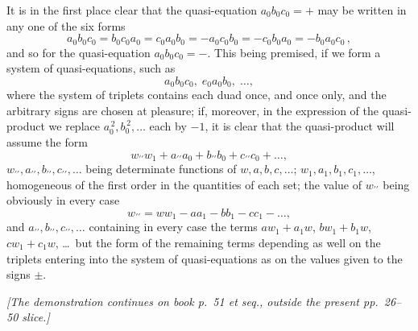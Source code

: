 \documentclass[11pt,a4paper]{article}
\theoremstyle{plain}
\begin{document}
It is in the first place clear that the quasi-equation $a_0 b_0 c_0 = +$ may be written in any one of the six forms
\[a_0 b_0 c_0 = b_0 c_0 a_0 = c_0 a_0 b_0 = -a_0 c_0 b_0 = -c_0 b_0 a_0 = -b_0 a_0 c_0\,,\]
and so for the quasi-equation $a_0 b_0 c_0 = -$. This being premised, if we form a system of quasi-equations, such as
\[a_0 b_0 c_0,\; e_0 a_0 b_0,\; \ldots,\]
where the system of triplets contains each duad once, and once only, and the arbitrary signs are chosen at pleasure; if, moreover, in the expression of the quasi-product we replace $a_0^{\,2}, b_0^{\,2}, \ldots$ each by $-1$, it is clear that the quasi-product will assume the form
\[w_{\prime\prime} w_1 + a_{\prime\prime} a_0 + b_{\prime\prime} b_0 + c_{\prime\prime} c_0 + \ldots,\]
$w_{\prime\prime}, a_{\prime\prime}, b_{\prime\prime}, c_{\prime\prime}, \ldots$ being determinate functions of $w, a, b, c, \ldots$; $w_1, a_1, b_1, c_1, \ldots$, homogeneous of the first order in the quantities of each set; the value of $w_{\prime\prime}$ being obviously in every case
\[w_{\prime\prime} = w w_1 - a a_1 - b b_1 - c c_1 - \ldots,\]
and $a_{\prime\prime}, b_{\prime\prime}, c_{\prime\prime}, \ldots$ containing in every case the terms $a w_1 + a_1 w$, $b w_1 + b_1 w$, $c w_1 + c_1 w$, \ldots\ but the form of the remaining terms depending as well on the triplets entering into the system of quasi-equations as on the values given to the signs $\pm$.

\bigskip
\noindent\emph{[The demonstration continues on book p.\ 51 et seq., outside the present pp.\ 26--50 slice.]}
\end{document}
